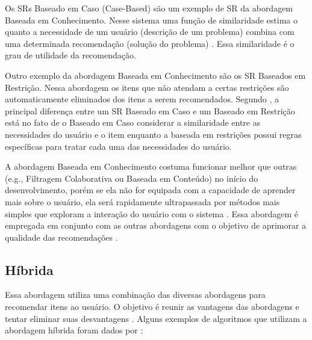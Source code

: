 Os SRs Baseado em Caso (Case-Based) são um exemplo de SR da abordagem Baseada em Conhecimento. Nesse sistema uma
função de similaridade estima o quanto a necessidade de um usuário (descrição de um problema) combina com uma
determinada recomendação (solução do problema) \cite{ricci2011introduction}. Essa similaridade é o grau de utilidade
da recomendação.

Outro exemplo da abordagem Baseada em Conhecimento são os SR Baseados em Restrição. Nessa abordagem os itens que não
atendam a certas restrições são automaticamente eliminados dos itens a serem recomendados. Segundo
, a principal diferença entre um SR Baseado em Caso e um Baseado em Restrição está
no fato de o Baseado em Caso considerar a similaridade entre as necessidades do usuário e o item enquanto a baseada
em restrições possui regras específicas para tratar cada uma das necessidades do usuário.

A abordagem Baseada em Conhecimento costuma funcionar melhor que outras (e.g., Filtragem Colaborativa ou Baseada em
Conteúdo) no início do desenvolvimento, porém se ela não for equipada com a capacidade de aprender mais sobre o usuário,
ela será rapidamente ultrapassada por métodos mais simples que exploram a interação do usuário com o sistema
\cite{ricci2011introduction}. Essa abordagem é empregada em conjunto com as outras abordagens com o objetivo de aprimorar
a qualidade das recomendações \cite{burke2002hybrid}.

\subsection{Híbrida}

Essa abordagem utiliza uma combinação das diversas abordagens para recomendar itens ao usuário. O objetivo é reunir as
vantagens das abordagens e tentar eliminar suas desvantagens \cite{burke2002hybrid}. Alguns exemplos de algoritmos que
utilizam a abordagem híbrida foram dados por :

